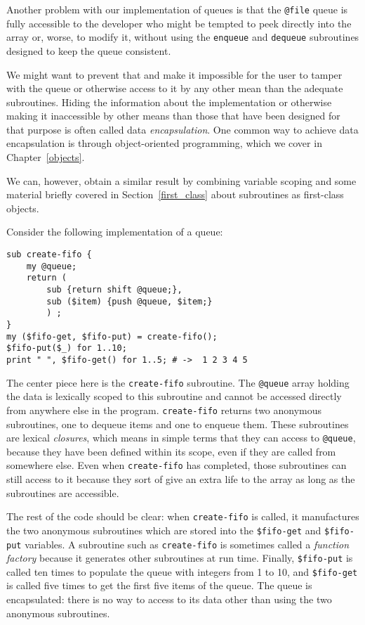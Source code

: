 Another problem with our implementation of queues is that 
the \verb'@file' queue is fully accessible to the developer 
who might be tempted to peek directly into the array or, 
worse, to modify it, without using the {\tt enqueue} and 
{\tt dequeue} subroutines designed to keep the queue 
consistent. 

We might want to prevent that and make it impossible for 
the user to tamper with the queue or otherwise access to it by 
any other mean than the adequate subroutines. Hiding the 
information about the implementation or otherwise making 
it inaccessible by other means than those that have been 
designed for that purpose is often called data 
\emph{encapsulation}. One common way to achieve data 
encapsulation is through object-oriented programming, which 
we cover in Chapter~\ref{objects}. 

We can, however, obtain 
a similar result by combining variable scoping and some 
material briefly covered in Section~\ref{first_class} about 
subroutines as first-class objects.

Consider the following implementation of a queue:
\begin{verbatim}
sub create-fifo {
    my @queue;
    return (
        sub {return shift @queue;}, 
        sub ($item) {push @queue, $item;}
        ) ;
}
my ($fifo-get, $fifo-put) = create-fifo();
$fifo-put($_) for 1..10;
print " ", $fifo-get() for 1..5; # ->  1 2 3 4 5
\end{verbatim}
%
The center piece here is the {\tt create-fifo} subroutine.
The \verb'@queue' array holding the data is lexically 
scoped to this subroutine and cannot be accessed directly 
from anywhere else in the program. {\tt create-fifo} returns 
two anonymous subroutines, one to dequeue items and one 
to enqueue them. These subroutines are lexical \emph{closures}, 
which means in simple terms that they can access to 
\verb'@queue', because they have been defined within its 
scope, even if they are called from somewhere else. Even 
when {\tt create-fifo} has completed, those subroutines 
can still access to it because they sort of give an extra 
life to the array as long as the subroutines are accessible.

The rest of the code should be clear: when {\tt create-fifo} is 
called, it manufactures the two anonymous subroutines which 
are stored into the \verb'$fifo-get' and \verb'$fifo-put' 
variables. A subroutine such as {\tt create-fifo} is 
sometimes called a \emph{function factory} because it 
generates other subroutines at run time.
Finally, \verb'$fifo-put' is called ten times to 
populate the queue with integers from 1 to 10, and 
\verb'$fifo-get' is called five times to get the first five 
items of the queue. The queue is encapsulated: there is 
no way to access to its data other than using the two 
anonymous subroutines.

